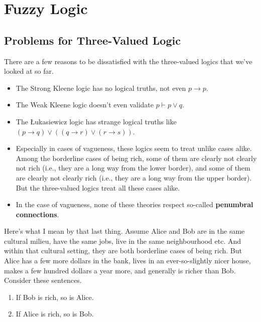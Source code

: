 \documentclass[
]{article}
\providecommand{\tightlist}{%
  \setlength{\itemsep}{0pt}\setlength{\parskip}{0pt}}\usepackage{longtable,booktabs,array}
\begin{document}
\hypertarget{fuzzy-logic}{%
\section{Fuzzy Logic}\label{fuzzy-logic}}

\hypertarget{problems-for-three-valued-logic}{%
\subsection{Problems for Three-Valued
Logic}\label{problems-for-three-valued-logic}}

There are a few reasons to be dissatisfied with the three-valued logics
that we've looked at so far.

\begin{itemize}
\tightlist
\item
  The Strong Kleene logic has no logical truths, not even
  \(p \rightarrow p\).
\item
  The Weak Kleene logic doesn't even validate \(p \vdash p \vee q\).
\item
  The Łukasiewicz logic has strange logical truths like
  \((p \rightarrow q) \vee ((q \rightarrow r) \vee (r \rightarrow s))\).
\item
  Especially in cases of vagueness, these logics seem to treat unlike
  cases alike. Among the borderline cases of being rich, some of them
  are clearly not clearly not rich (i.e., they are a long way from the
  lower border), and some of them are clearly not clearly rich (i.e.,
  they are a long way from the upper border). But the three-valued
  logics treat all these cases alike.
\item
  In the case of vagueness, none of these theories respect so-called
  \textbf{penumbral connections}.
\end{itemize}

Here's what I mean by that last thing. Assume Alice and Bob are in the
same cultural milieu, have the same jobs, live in the same neighbourhood
etc. And within that cultural setting, they are both borderline cases of
being rich. But Alice has a few more dollars in the bank, lives in an
ever-so-slightly nicer house, makes a few hundred dollars a year more,
and generally is richer than Bob. Consider these sentences.

\begin{enumerate}
\def\labelenumi{\arabic{enumi}.}
\tightlist
\item
  If Bob is rich, so is Alice.
\item
  If Alice is rich, so is Bob.
\end{enumerate}
\end{document}
